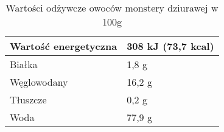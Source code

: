 \begin{table}[ht]
\centering
\begin{tabular}{|l|l|}
\hline
Wartość energetyczna & 308 kJ (73,7 kcal) \\ \hline
Białka               & 1,8 g              \\ \hline
Węglowodany          & 16,2 g             \\ \hline
Tłuszcze             & 0,2 g              \\ \hline
Woda                 & 77,9 g             \\ \hline
\end{tabular}
\caption{Wartości odżywcze owoców monstery dziurawej w 100g}
\label{tab:my-table}
\end{table}